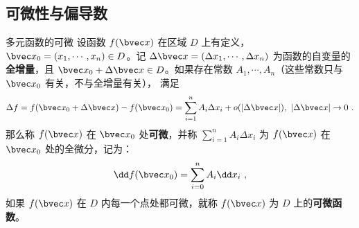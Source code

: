 \subsection{可微性与偏导数}
\begin{definition}{多元函数的可微}
设函数 $f(\bvec x)$ 在区域 $D$ 上有定义，$\bvec x_0=(x_1,\cdots,x_n)\in D$。记 $\Delta \bvec x=(\Delta x_1,\cdots,\Delta x_n)$ 为函数的自变量的\textbf{全增量}，且 $\bvec x_0+\Delta\bvec x\in D$。如果存在常数 $A_1,\cdots,A_n$（这些常数只与 $\bvec x_0$ 有关，不与全增量有关），
满足
\begin{equation}
\Delta f=f(\bvec x_0+\Delta \bvec x)-f(\bvec x_0)=\sum_{i=1}^n A_i \Delta x_i+o(|\Delta \bvec x|),\ |\Delta \bvec x|\rightarrow 0~.
\end{equation}
那么称 $f(\bvec x)$ 在 $\bvec x_0$ 处\textbf{可微}，并称 $\sum_{i=1}^n A_i \Delta x_i$ 为 $f(\bvec x)$ 在 $\bvec x_0$ 处的全微分，记为：
\begin{equation}
\dd f(\bvec x_0)=\sum_{i=0}^n A_i\dd x_i~,
\end{equation}
如果 $f(\bvec x)$ 在 $D$ 内每一个点处都可微，就称 $f(\bvec x)$ 为 $D$ 上的\textbf{可微函数}。
\end{definition}
